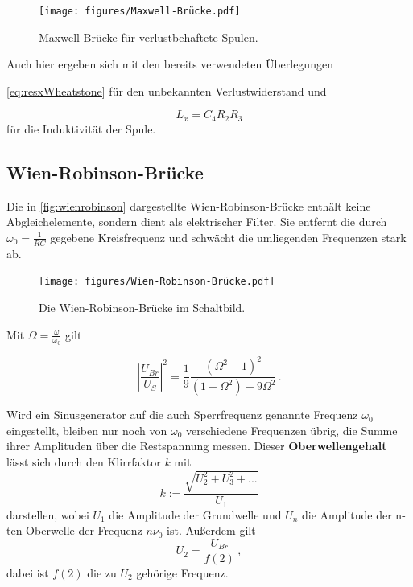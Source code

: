 \begin{figure}[H]
    \centering
    \texttt{[image: figures/Maxwell-Brücke.pdf]}
    \caption{Maxwell-Brücke für verlustbehaftete Spulen\cite{ap07}.}
    \label{fig:maxwellbrü}
\end{figure}

Auch hier ergeben sich mit den bereits verwendeten Überlegungen

\eqref{eq:resxWheatstone} für den unbekannten Verlustwiderstand und

\begin{equation}
    L_x = C_4 R_2 R_3
    \label{eq:induxmaxwell}
\end{equation} für die Induktivität der Spule.


\subsection{Wien-Robinson-Brücke}
\label{subsec:wienrobinson}

Die in \autoref{fig:wienrobinson} dargestellte Wien-Robinson-Brücke enthält keine Abgleichelemente, 
sondern dient als elektrischer Filter.
Sie entfernt die durch $ω_0 = \frac{1}{R C}$ gegebene Kreisfrequenz und schwächt die umliegenden 
Frequenzen stark ab. 

\begin{figure}[H]
    \centering
    \texttt{[image: figures/Wien-Robinson-Brücke.pdf]}
    \caption{Die Wien-Robinson-Brücke im Schaltbild\cite{ap07}.}
    \label{fig:wienrobinson}
\end{figure}

Mit $Ω = \frac{ω}{ω_0}$ gilt

\begin{equation}
    \left|\frac{U_{Br}}{U_S}\right|^2 = \frac{1}{9} \frac{(Ω^2 - 1)^2}{(1 - Ω^2) +9Ω^2} \,.
    \label{eq:omegadingens}
\end{equation}

Wird ein Sinusgenerator auf die auch Sperrfrequenz genannte Frequenz $ω_0$ eingestellt, bleiben nur
noch von $ω_0$ verschiedene Frequenzen übrig, die Summe ihrer Amplituden über die Restspannung messen.
Dieser \textbf{Oberwellengehalt} lässt sich durch den Klirrfaktor $k$ mit 
\begin{equation}
    k := \frac{\sqrt{U_2^2 + U_3^2 + ...}}{U_1}
    \label{eq:klirrfaktor}
\end{equation} darstellen, wobei $U_1$ die Amplitude der Grundwelle und $U_n$ die Amplitude der n-ten
Oberwelle der Frequenz $n ν_0$ ist.
Außerdem gilt
\begin{equation}
    U_2 = \frac{U_{Br}}{f(2)}\,,
    \label{eq:U2klirr}
\end{equation} dabei ist $f(2)$ die zu $U_2$ gehörige Frequenz.


